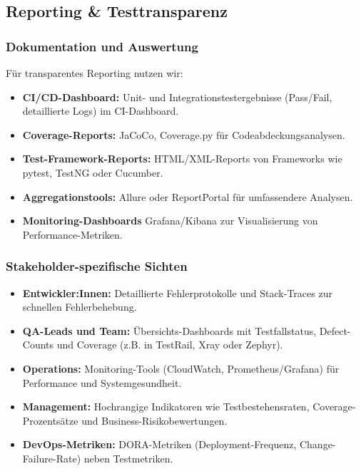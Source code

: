 \subsection{Reporting \& Testtransparenz}

\subsubsection{Dokumentation und Auswertung}
Für transparentes Reporting nutzen wir:

\begin{itemize}
    \item \textbf{CI/CD-Dashboard:} Unit- und Integrationstestergebnisse
    (Pass/Fail, detaillierte Logs) im CI-Dashboard.
    \item \textbf{Coverage-Reports:} JaCoCo, Coverage.py für Codeabdeckungsanalysen.
    \item \textbf{Test-Framework-Reports:} HTML/XML-Reports von Frameworks wie pytest, TestNG
    oder Cucumber.
    \item \textbf{Aggregationstools:} Allure oder ReportPortal für umfassendere Analysen.
    \item \textbf{Monitoring-Dashboards} Grafana/Kibana zur Visualisierung von Performance-Metriken.
\end{itemize}

\subsubsection{Stakeholder-spezifische Sichten}

\begin{itemize}
    \item \textbf{Entwickler:Innen:} Detaillierte Fehlerprotokolle und Stack-Traces zur schnellen
    Fehlerbehebung.
    \item \textbf{QA-Leads und Team:} Übersichts-Dashboards mit Testfallstatus, Defect-Counts und
    Coverage (z.B. in TestRail, Xray oder Zephyr).
    \item \textbf{Operations:} Monitoring-Tools (CloudWatch, Prometheus/Grafana) für Performance
    und Systemgesundheit.
    \item \textbf{Management:} Hochrangige Indikatoren wie Testbestehensraten, Coverage-Prozentsätze
    und Business-Risikobewertungen.
    \item \textbf{DevOps-Metriken:} DORA-Metriken (Deployment-Frequenz, Change-Failure-Rate) neben
    Testmetriken.
\end{itemize}

